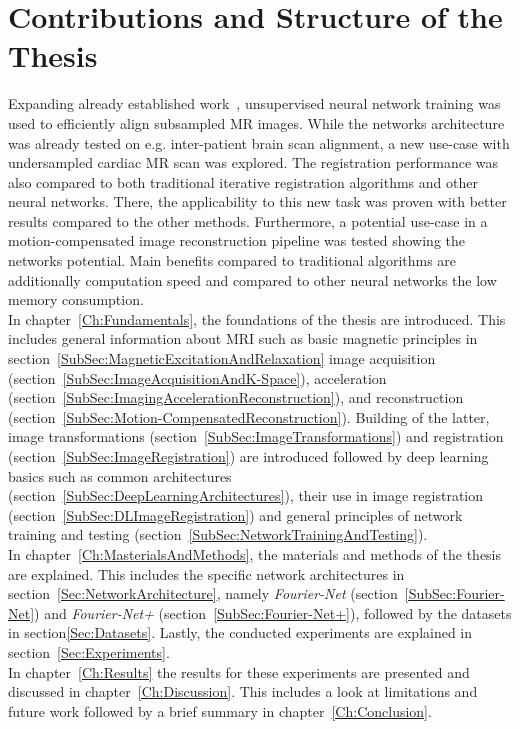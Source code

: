 \section{Contributions and Structure of the Thesis} \label{Sec:ContributionsAndStructure}
Expanding already established work~\cite{Fourier-Net,Fourier-Net+}, unsupervised neural network training was used to efficiently align subsampled MR images. While the networks architecture was already tested on e.g. inter-patient brain scan alignment, a new use-case with undersampled cardiac MR scan was explored. The registration performance was also compared to both traditional iterative registration algorithms and other neural networks. There, the applicability to this new task was proven with better results compared to the other methods. Furthermore, a potential use-case in a motion-compensated image reconstruction pipeline was tested
showing the networks potential. Main benefits compared to traditional algorithms are additionally computation speed and compared to other neural networks the low memory consumption.\\
In chapter~\ref{Ch:Fundamentals}, the foundations of the thesis are introduced. This includes general information about MRI such as basic magnetic principles in section~\ref{SubSec:MagneticExcitationAndRelaxation} image acquisition (section~\ref{SubSec:ImageAcquisitionAndK-Space}), acceleration (section~\ref{SubSec:ImagingAccelerationReconstruction}), and reconstruction (section~\ref{SubSec:Motion-CompensatedReconstruction}). Building of the latter, image transformations (section~\ref{SubSec:ImageTransformations}) and registration (section~\ref{SubSec:ImageRegistration}) are introduced followed by deep learning basics such as common architectures (section~\ref{SubSec:DeepLearningArchitectures}), their use in image registration (section~\ref{SubSec:DLImageRegistration}) and general principles of network training and testing (section~\ref{SubSec:NetworkTrainingAndTesting}).\\
In chapter~\ref{Ch:MasterialsAndMethods}, the materials and methods of the thesis are explained. This includes the specific network architectures in section~\ref{Sec:NetworkArchitecture}, namely \emph{Fourier-Net} (section~\ref{SubSec:Fourier-Net}) and \emph{Fourier-Net+} (section~\ref{SubSec:Fourier-Net+}), followed by the datasets in section\ref{Sec:Datasets}.
Lastly, the conducted experiments are explained in section~\ref{Sec:Experiments}.\\
In chapter~\ref{Ch:Results} the results for these experiments are presented and discussed in chapter~\ref{Ch:Discussion}. This includes a look at limitations and future work followed by a brief summary in chapter~\ref{Ch:Conclusion}.
